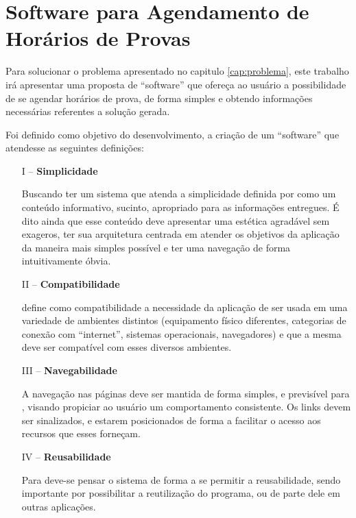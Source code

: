 \chapter{Software para Agendamento de Horários de Provas}
\pagestyle{simple}
\label{cap:software}

Para solucionar o problema apresentado no capitulo \ref{cap:problema}, este trabalho irá apresentar uma proposta de “software” que ofereça ao usuário a possibilidade de se agendar horários de prova, de forma simples e obtendo informações necessárias referentes a solução gerada.

Foi definido como objetivo do desenvolvimento, a criação de um “software” que atendesse as seguintes definições:
\begin{enumerate}
    \item[I --] \textbf{Simplicidade}
    
    Buscando ter um sistema que atenda a simplicidade definida por  como um conteúdo informativo, sucinto, apropriado para as informações entregues. É dito ainda que esse conteúdo deve apresentar uma estética agradável sem exageros, ter sua arquitetura centrada em atender os objetivos da aplicação da maneira mais simples possível e ter uma navegação de forma intuitivamente óbvia.
    
    \item[II --] \textbf{Compatibilidade}
    
 define como compatibilidade a necessidade da aplicação de ser usada em uma variedade de ambientes distintos (equipamento físico diferentes, categorias de conexão com “internet”, sistemas operacionais, navegadores) e que a mesma deve ser compatível com esses diversos ambientes.
    
    \item[III --] \textbf{Navegabilidade}
    
 A navegação nas páginas deve ser mantida de forma simples, e previsível para , visando propiciar ao usuário um comportamento consistente. Os links devem ser sinalizados, e estarem posicionados de forma a facilitar o acesso aos recursos que esses forneçam.
    
    \item[IV --] \textbf{Reusabilidade}
    
Para  deve-se pensar o sistema de forma a se permitir a reusabilidade, sendo importante por possibilitar a reutilização do programa, ou de parte dele em outras aplicações.  
    
\end{enumerate}


